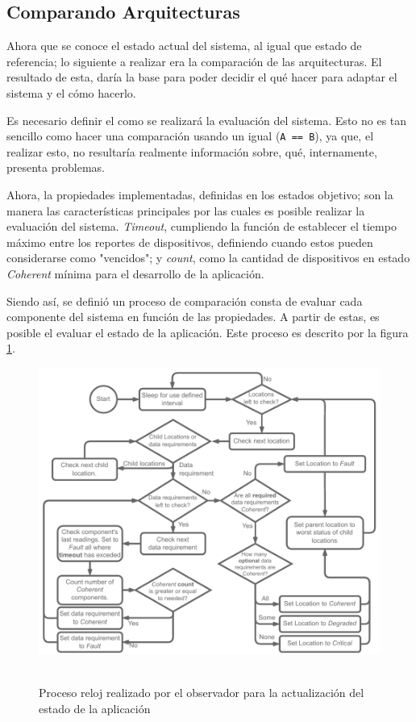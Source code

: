 \subsection{Comparando Arquitecturas} \label{sec:comparando}

Ahora que se conoce el estado actual del sistema, al igual que estado de referencia; lo siguiente a realizar era la comparación de las arquitecturas. El resultado de esta, daría la base para poder decidir el qué hacer para adaptar el sistema y el cómo hacerlo.

Es necesario definir el como se realizará la evaluación del sistema. Esto no es tan sencillo como hacer una comparación usando un igual (\texttt{A == B}), ya que, el realizar esto, no resultaría realmente información sobre, qué, internamente, presenta problemas.

Ahora, la propiedades implementadas, definidas en los estados objetivo; son la manera las características principales por las cuales es posible realizar la evaluación del sistema. \textit{Timeout}, cumpliendo la función de establecer el tiempo máximo entre los reportes de dispositivos, definiendo cuando estos pueden considerarse como "vencidos"; y \textit{count}, como la cantidad de dispositivos en estado \textit{Coherent} mínima para el desarrollo de la aplicación.

Siendo así, se definió un proceso de comparación consta de evaluar cada componente del sistema en función de las propiedades. A partir de estas, es posible el evaluar el estado de la aplicación. Este proceso es descrito por la figura \ref{fig:LookerProcessClock}.

\begin{figure}[ht]
    \centering
    \caption{\\Proceso reloj realizado por el observador para la actualización del estado de la aplicación} 
    \includegraphics[width=0.85\linewidth]{images/LookerProcessClock.pdf}
    \label{fig:LookerProcessClock}
\end{figure} 

